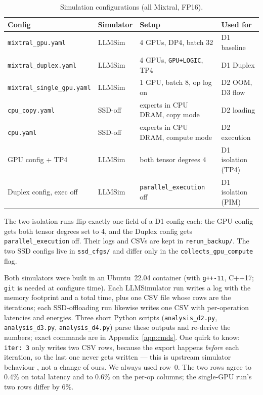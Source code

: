 \documentclass[11pt,a4paper]{report}
\begin{document}
\begin{table}[htbp]
\centering
\footnotesize
\caption{Simulation configurations (all Mixtral, FP16).}
\label{tab:cfgs}
\begin{tabular}{llll}
\toprule
Config & Simulator & Setup & Used for \\
\midrule
\texttt{mixtral\_gpu.yaml} & LLMSim & 4 GPUs, DP4, batch 32 & D1 baseline \\
\texttt{mixtral\_duplex.yaml} & LLMSim & 4 GPUs, \texttt{GPU+LOGIC}, TP4 & D1 Duplex \\
\texttt{mixtral\_single\_gpu.yaml} & LLMSim & 1 GPU, batch 8, op log on & D2 OOM, D3 flow \\
\texttt{cpu\_copy.yaml} & SSD-off & experts in CPU DRAM, copy mode & D2 loading \\
\texttt{cpu.yaml} & SSD-off & experts in CPU DRAM, compute mode & D2 execution \\
GPU config + TP4 & LLMSim & both tensor degrees 4 & D1 isolation (TP4) \\
Duplex config, exec off & LLMSim & \texttt{parallel\_execution} off & D1 isolation (PIM) \\
\bottomrule
\end{tabular}
\end{table}

The two isolation runs flip exactly one field of a D1 config each: the GPU config gets both tensor degrees set to 4, and the Duplex config gets \texttt{parallel\_execution} off. Their logs and CSVs are kept in \texttt{rerun\_backup/}. The two SSD configs live in \texttt{ssd\_cfgs/} and differ only in the \texttt{collects\_gpu\_compute} flag.

Both simulators were built in an Ubuntu~22.04 container (with \texttt{g++-11}, C++17; \texttt{git} is needed at configure time). Each LLMSimulator run writes a log with the memory footprint and a total time, plus one CSV file whose rows are the iterations; each SSD-offloading run likewise writes one CSV with per-operation latencies and energies. Three short Python scripts (\texttt{analysis\_d2.py}, \texttt{analysis\_d3.py}, \texttt{analysis\_d4.py}) parse these outputs and re-derive the numbers; exact commands are in Appendix~\ref{app:cmds}. One quirk to know: \texttt{iter: 3} only writes two CSV rows, because the export happens \textit{before} each iteration, so the last one never gets written --- this is upstream simulator behaviour \cite{llmsim}, not a change of ours. We always used row~0. The two rows agree to 0.4\% on total latency and to 0.6\% on the per-op columns; the single-GPU run's two rows differ by 6\%.
\end{document}
